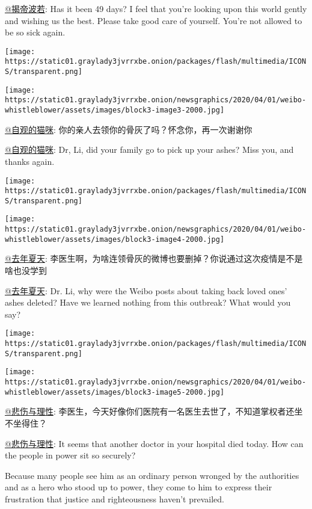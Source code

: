 \href{https://www.weibo.com/u/2637030927?is_hot=1}{@揭帝波若}: Has it
been 49 days? I feel that you're looking upon this world gently and
wishing us the best. Please take good care of yourself. You're not
allowed to be so sick again.

\texttt{[image: https://static01.graylady3jvrrxbe.onion/packages/flash/multimedia/ICONS/transparent.png]}

\texttt{[image: https://static01.graylady3jvrrxbe.onion/newsgraphics/2020/04/01/weibo-whistleblower/assets/images/block3-image3-2000.jpg]}

\href{https://www.weibo.com/u/1858869507?is_hot=1}{@自观的猫咪}:
你的亲人去领你的骨灰了吗？怀念你，再一次谢谢你

\href{https://www.weibo.com/u/1858869507?is_hot=1}{@自观的猫咪}: Dr, Li,
did your family go to pick up your ashes? Miss you, and thanks again.

\texttt{[image: https://static01.graylady3jvrrxbe.onion/packages/flash/multimedia/ICONS/transparent.png]}

\texttt{[image: https://static01.graylady3jvrrxbe.onion/newsgraphics/2020/04/01/weibo-whistleblower/assets/images/block3-image4-2000.jpg]}

\href{https://www.weibo.com/lastsummer365?is_all=1}{@去年夏天}:
李医生啊，为啥连领骨灰的微博也要删掉？你说通过这次疫情是不是啥也没学到

\href{https://www.weibo.com/lastsummer365?is_all=1}{@去年夏天}: Dr. Li,
why were the Weibo posts about taking back loved ones' ashes deleted?
Have we learned nothing from this outbreak? What would you say?

\texttt{[image: https://static01.graylady3jvrrxbe.onion/packages/flash/multimedia/ICONS/transparent.png]}

\texttt{[image: https://static01.graylady3jvrrxbe.onion/newsgraphics/2020/04/01/weibo-whistleblower/assets/images/block3-image5-2000.jpg]}

\href{https://www.weibo.com/u/2578106302}{@悲伤与理性}:
李医生，今天好像你们医院有一名医生去世了，不知道掌权者还坐不坐得住？

\href{https://www.weibo.com/u/2578106302}{@悲伤与理性}: It seems that
another doctor in your hospital died today. How can the people in power
sit so securely?

Because many people see him as an ordinary person wronged by the
authorities and as a hero who stood up to power, they come to him to
express their frustration that justice and righteousness haven't
prevailed.

